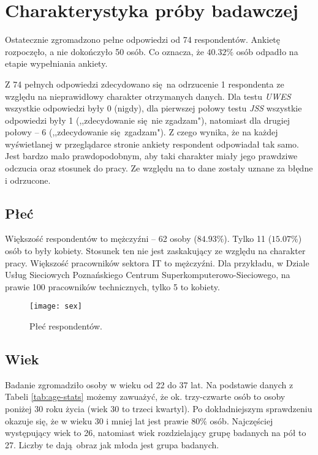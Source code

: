 \section{Charakterystyka próby badawczej} 
Ostatecznie zgromadzono pełne odpowiedzi od 74 respondentów. Ankietę rozpoczęło, a nie dokończyło 50 osób. Co oznacza, że $40.32\%$ osób odpadło na etapie wypełniania ankiety. 

Z 74 pełnych odpowiedzi zdecydowano się na odrzucenie 1 respondenta ze względu na nieprawidłowy charakter otrzymanych danych. Dla testu \emph{UWES} wszystkie odpowiedzi były 0 (nigdy), dla pierwszej połowy testu \emph{JSS} wszystkie odpowiedzi były 1 (,,zdecydowanie się nie zgadzam"), natomiast dla drugiej połowy -- 6 (,,zdecydowanie się zgadzam"). Z czego wynika, że na każdej wyświetlanej w przeglądarce stronie ankiety respondent odpowiadał tak samo. Jest bardzo mało
prawdopodobnym, aby taki charakter miały jego prawdziwe odczucia oraz stosunek do pracy. Ze względu na to dane zostały uznane za błędne i odrzucone.
\subsection{Płeć}
Większość respondentów to mężczyźni -- 62 osoby ($84.93\%$). Tylko 11 ($15.07\%$) osób to były kobiety. Stosunek ten nie jest zaskakujący ze względu na charakter pracy. Większość pracowników sektora IT to mężczyźni. Dla przykładu, w Dziale Usług Sieciowych Poznańskiego Centrum Superkomputerowo-Sieciowego, na prawie 100 pracowników technicznych, tylko 5 to kobiety.

\begin{figure}[h]
\begin{center}
\texttt{[image: sex]}
\end{center}
\caption{Płeć respondentów.}
\label{fig:sex}
\end{figure}

\subsection{Wiek}
Badanie zgromadziło osoby w wieku od 22 do 37 lat. Na podstawie danych z Tabeli \ref{tab:age-stats} możemy zawuażyć, że ok. trzy-czwarte osób to osoby poniżej 30 roku życia (wiek 30 to trzeci kwartyl). Po dokładniejszym sprawdzeniu okazuje się, że w wieku 30 i mniej lat jest prawie $80\%$ osób.  Najczęściej występujący wiek to 26, natomiast wiek rozdzielający grupę badanych na pół to 27. Liczby te dają obraz jak młoda jest grupa badanych. 

